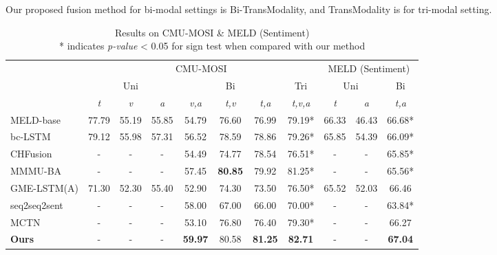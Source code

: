 \documentclass[sigconf]{acmart}
\begin{document}
	Our proposed fusion method for bi-modal settings is Bi-TransModality, and TransModality is for tri-modal setting.  
	\begin{table*}[t]
		\centering
		\caption{Results on CMU-MOSI \& MELD (Sentiment) \\ * indicates \textit{p-value} < 0.05 for sign test when compared with our method}
		\begin{tabular}{|l|ccc|ccc|c|cc|c|}
		\hline
		\multirow{3}[6]{*}{} & \multicolumn{7}{c|}{CMU-MOSI}                         & \multicolumn{3}{c|}{MELD (Sentiment)} \\
		\cline{2-11}      & \multicolumn{3}{c|}{Uni} & \multicolumn{3}{c|}{Bi} & Tri   & \multicolumn{2}{c|}{Uni} & Bi \\
		\cline{2-11}      & \textit{{t}} & \textit{{v}} & \textit{{a}} & \textit{{v,a}} & \textit{{t,v}} & \textit{{t,a}} & \textit{{t,v,a}} & \textit{{t}} & \textit{{a}} & \textit{{t,a}} \\
		\hline
		\hline
		MELD-base & 77.79     & 55.19     & 55.85     & 54.79     & 76.60     & 76.99     & 79.19*     & 66.33  & 46.43  & 66.68* \\
		bc-LSTM & 79.12  & 55.98  & 57.31  & 56.52  & 78.59  & 78.86  & 79.26*  & 65.85  & 54.39  & 66.09*  \\
		CHFusion & -    & -    & -    & 54.49  & 74.77  & 78.54  & 76.51*  & -    & -    & 65.85*  \\
		MMMU-BA & -    & -    & -    & 57.45  & \textbf{80.85 } & 79.92  & 81.25*  & -    & -    & 65.56*  \\
		GME-LSTM(A) & 71.30     & 52.30     & 55.40     & 52.90  & 74.30  & 73.50  & 76.50*  & 65.52  & 52.03  & 66.46  \\
		seq2seq2sent & -    & -    & -    & 58.00  & 67.00  & 66.00  & 70.00*  & -    & -    & 63.84*  \\
		MCTN  & -    & -    & -    & 53.10  & 76.80  & 76.40  & 79.30*  & -    & -    & 66.27 \\
		\hline
		\textbf{Ours} & -    & -    & -    & \textbf{59.97 } & 80.58  & \textbf{81.25 } & \textbf{82.71 } & -    & -    & \textbf{67.04 } \\
		\hline
		\end{tabular}\label{tab:resulta}\end{table*}
\end{document}
